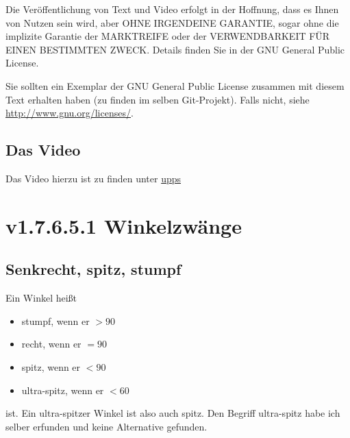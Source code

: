 \documentclass[a4paper]{amsart}
\theoremstyle{definition}
\begin{document}
Die Veröffentlichung von Text und Video erfolgt in der Hoffnung, dass es Ihnen von Nutzen sein wird, 
aber OHNE IRGENDEINE GARANTIE, sogar ohne die implizite Garantie der MARKTREIFE oder der 
VERWENDBARKEIT FÜR EINEN BESTIMMTEN ZWECK. Details finden Sie in der GNU General Public License.

Sie sollten ein Exemplar der GNU General Public License zusammen mit diesem Text erhalten haben 
(zu finden im selben Git-Projekt). 
Falls nicht, siehe \url{http://www.gnu.org/licenses/}.

\subsection*{Das Video}
Das Video hierzu ist zu finden unter 
{\tiny
   \url{upps}
}

\section{v1.7.6.5.1 Winkelzwänge}

\subsection{Senkrecht, spitz, stumpf}
Ein Winkel heißt
\begin{itemize}
   \item stumpf, wenn er $> 90$
   \item recht, wenn er $= 90$
   \item spitz, wenn er $< 90$
   \item ultra-spitz, wenn er $< 60$
\end{itemize}
ist. Ein ultra-spitzer Winkel ist also auch spitz. Den Begriff ultra-spitz habe ich selber erfunden und keine Alternative gefunden.

\end{document}
